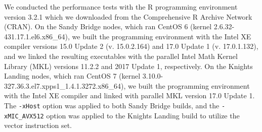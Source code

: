 We conducted the performance tests with the R programming environment version
  3.2.1 which we downloaded from the Comprehensive R Archive Network (CRAN).
On the Sandy Bridge nodes, which ran CentOS 6 (kernel
  2.6.32-431.17.1.el6.x86\_64), we built the programming environment with
  the Intel XE compiler versions 15.0 Update 2 (v. 15.0.2.164) and
  17.0 Update 1 (v. 17.0.1.132), and we linked the resulting executables with
  the parallel Intel Math Kernel Library (MKL) versions 11.2.2 and 2017 Update
  1, respectively.
On the Knights Landing nodes, which ran CentOS 7 (kernel
  3.10.0-327.36.3.el7.xpps1\_1.4.1.3272.x86\_64), we built the programming
  environment with the Intel XE compiler and linked with parallel MKL
  version 17.0 Update 1.
The \texttt{-xHost} option was applied to both Sandy Bridge builds, and the
  \texttt{-xMIC\_AVX512} option was applied to the Knights Landing build to
  utilize the vector instruction set.


